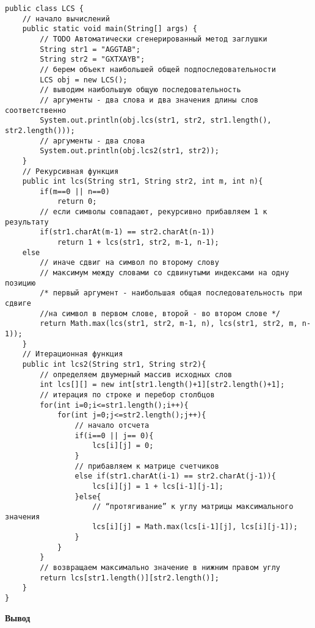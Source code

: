 \vspace{\baselineskip}
\begin{tcolorbox}
\begin{verbatim}
public class LCS {
	// начало вычислений
	public static void main(String[] args) {
		// TODO Автоматически сгенерированный метод заглушки
		String str1 = "AGGTAB";
		String str2 = "GXTXAYB";
		// берем объект наибольшей общей подпоследовательности
		LCS obj = new LCS();
		// выводим наибольшую общую последовательность
		// аргументы - два слова и два значения длины слов соответственно
		System.out.println(obj.lcs(str1, str2, str1.length(), str2.length()));
		// аргументы - два слова
		System.out.println(obj.lcs2(str1, str2));
	}
	// Рекурсивная функция
	public int lcs(String str1, String str2, int m, int n){
		if(m==0 || n==0)
			return 0;
		// если символы совпадают, рекурсивно прибавляем 1 к результату
		if(str1.charAt(m-1) == str2.charAt(n-1))
			return 1 + lcs(str1, str2, m-1, n-1);
	else
		// иначе сдвиг на символ по второму слову
		// максимум между словами со сдвинутыми индексами на одну позицию
		/* первый аргумент - наибольшая общая последовательность при сдвиге 
		//на символ в первом слове, второй - во втором слове */ 
		return Math.max(lcs(str1, str2, m-1, n), lcs(str1, str2, m, n-1));
	}
	// Итерационная функция
	public int lcs2(String str1, String str2){
		// определяем двумерный массив исходных слов
		int lcs[][] = new int[str1.length()+1][str2.length()+1];
		// итерация по строке и перебор столбцов
		for(int i=0;i<=str1.length();i++){
			for(int j=0;j<=str2.length();j++){
				// начало отсчета
				if(i==0 || j== 0){
					lcs[i][j] = 0;
				}
				// прибавляем к матрице счетчиков
				else if(str1.charAt(i-1) == str2.charAt(j-1)){
					lcs[i][j] = 1 + lcs[i-1][j-1];
				}else{
					// “протягивание” к углу матрицы максимального значения	
					lcs[i][j] = Math.max(lcs[i-1][j], lcs[i][j-1]);
				}
			}
		}
		// возвращаем максимально значение в нижним правом углу
		return lcs[str1.length()][str2.length()];
	}
}
\end{verbatim}
\end{tcolorbox}

\vspace{\baselineskip}
\textbf{Вывод}

\vspace{\baselineskip}
\begin{tcolorbox}
\color{Purple}{4}
\end{tcolorbox}

\vspace{\baselineskip}

